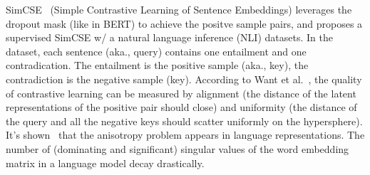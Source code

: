 SimCSE~ (Simple Contrastive Learning of Sentence Embeddings) leverages the dropout mask (like in BERT) to achieve the positve sample pairs, and proposes a supervised SimCSE w/ a natural language inference (NLI) datasets.
In the dataset, each sentence (aka., query) contains one entailment and one contradication.
The entailment is the positive sample (aka., key), the contradiction is the negative sample (key).
According to Want et al.~, the quality of contrastive learning can be measured by alignment (the distance of the latent representations of the positive pair should close) and uniformity (the distance of the query and all the negative keys should scatter uniformly on the hypersphere).
It's shown~ that the anisotropy problem appears in language representations.
The number of (dominating and significant) singular values of the word embedding matrix in a language model decay drastically.

